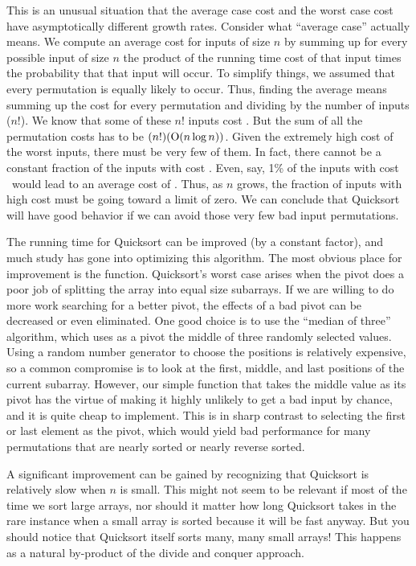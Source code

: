 This is an unusual situation that the average case cost and the worst
case cost have asymptotically different growth rates.
Consider what ``average case'' actually means.
We compute an average cost for inputs of size \(n\) by summing up for
every possible input of size \(n\) the product of the running time
cost of that input times the probability that that input will occur.
To simplify things, we assumed that every permutation is equally
likely to occur.
Thus, finding the average means summing up the cost for every
permutation and dividing by the number of inputs (\(n!\)).
We know that some of these \(n!\) inputs cost \Ontwo.
But the sum of all the permutation costs has to be \((n!)(\mbox{${\rm O}(n \log n)$})\).
Given the extremely high cost of the worst inputs, there must be
very few of them.
In fact, there cannot be a constant fraction of the inputs with cost
\Ontwo.
Even, say, 1\% of the inputs with cost \Ontwo\ would lead to an
average cost of \Ontwo.
Thus, as \(n\) grows, the fraction of inputs with high cost must be
going toward a limit of zero.
We can conclude that Quicksort will have good behavior if
we can avoid those very few bad input permutations.

The running time for Quicksort can be improved (by a constant factor),
and much study has gone into optimizing this algorithm.
The most obvious place for improvement is the 
function.
Quicksort's worst case arises when the pivot does a poor job of
splitting the array into equal size subarrays.
If we are willing to do more work searching for a better pivot, the
effects of a bad pivot can be decreased or even eliminated.
One good choice is to use the ``median of three'' algorithm, which
uses as a pivot the middle of three randomly selected values.
Using a random number generator to choose the positions is relatively
expensive, so a common compromise is to look at the first, middle, and
last positions of the current subarray.
However, our simple  function that takes the middle
value as its pivot has the virtue of making it highly unlikely to get
a bad input by chance, and it is quite cheap to implement.
This is in sharp contrast to selecting the first or last element as
the pivot, which would yield bad performance for many permutations
that are nearly sorted or nearly reverse sorted.

A significant improvement can be gained by recognizing that
Quicksort is relatively slow when \(n\) is
small.
This might not seem to be relevant if most of the time we sort
large arrays, nor should it matter how long Quicksort takes in the
rare instance when a small array is sorted because it will be fast
anyway.
But you should notice that Quicksort itself sorts many, many small
arrays!
This happens as a natural by-product of the divide and conquer
approach.

